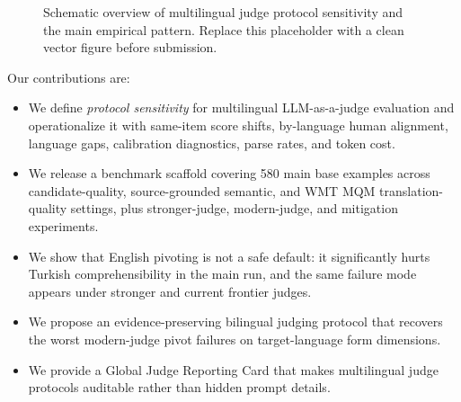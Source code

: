 \documentclass{article}
\begin{document}
\begin{figure}[t]
\centering
{}
\caption{Schematic overview of multilingual judge protocol sensitivity and the main empirical pattern. Replace this placeholder with a clean vector figure before submission.}
\label{fig:overview}
\end{figure}

Our contributions are:
\begin{itemize}
    \item We define \emph{protocol sensitivity} for multilingual LLM-as-a-judge evaluation and operationalize it with same-item score shifts, by-language human alignment, language gaps, calibration diagnostics, parse rates, and token cost.
    \item We release a benchmark scaffold covering 580 main base examples across candidate-quality, source-grounded semantic, and WMT MQM translation-quality settings, plus stronger-judge, modern-judge, and mitigation experiments.
    \item We show that English pivoting is not a safe default: it significantly hurts Turkish comprehensibility in the main run, and the same failure mode appears under stronger and current frontier judges.
    \item We propose an evidence-preserving bilingual judging protocol that recovers the worst modern-judge pivot failures on target-language form dimensions.
    \item We provide a Global Judge Reporting Card that makes multilingual judge protocols auditable rather than hidden prompt details.
\end{itemize}
\end{document}
